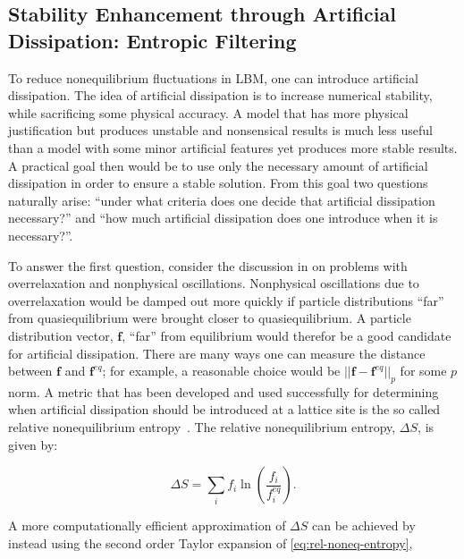 \documentclass[pdftex,ms]{pittetd}
\begin{document}
\subsection{Stability Enhancement through Artificial Dissipation: Entropic Filtering}

To reduce nonequilibrium fluctuations in LBM, one can introduce artificial dissipation.
The idea of artificial dissipation is to increase numerical stability, while sacrificing some physical accuracy.
A model that has more physical justification but produces unstable and nonsensical results is much less useful than a model with some minor artificial features yet produces more stable results.
A practical goal then would be to use only the necessary amount of artificial dissipation in order to ensure a stable solution.
From this goal two questions naturally arise: ``under what criteria does one decide that artificial dissipation necessary?'' and ``how much artificial dissipation does one introduce when it is necessary?''.

To answer the first question, consider the discussion in  on problems with overrelaxation and nonphysical oscillations.
Nonphysical oscillations due to overrelaxation would be damped out more quickly if particle distributions ``far'' from quasiequilibrium were brought closer to quasiequilibrium.
A particle distribution vector, $\mathbf{f}$, ``far'' from equilibrium would therefor be a good candidate for artificial dissipation.
There are many ways one can measure the distance between $\mathbf{f}$ and $\mathbf{f}^{eq}$; for example, a reasonable choice would be $||\mathbf{f} - \mathbf{f}^{eq}||_p$ for some $p$ norm.
A metric that has been developed and used successfully for determining when artificial dissipation should be introduced at a lattice site is the so called relative nonequilibrium entropy~\cite{gorban2014enhancement,brownlee2006stabilization,brownlee2007stability,brownlee2008nonequilibrium,packwood2009entropy}.
The relative nonequilibrium entropy, $\Delta S$, is given by:

\begin{equation} \label{eq:rel-noneq-entropy}
\Delta S = \sum_i f_i \ln(\frac{f_i}{f^{eq}_i}).
\end{equation}

\noindent A more computationally efficient approximation of $\Delta S$ can be achieved by instead using the second order Taylor expansion of \eqref{eq:rel-noneq-entropy},
\end{document}
